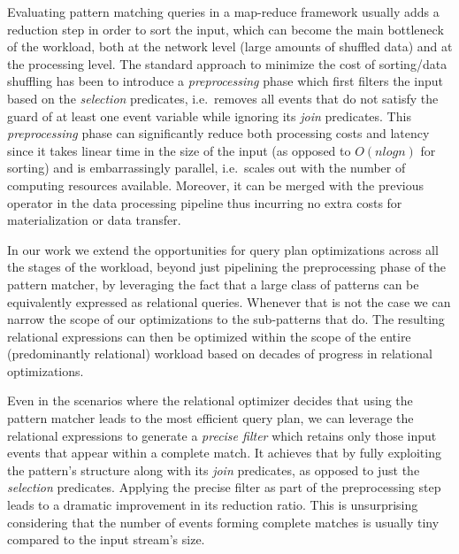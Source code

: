 Evaluating pattern matching queries in a map-reduce framework usually 
adds a reduction step in order to sort the input, which can become the main 
bottleneck of the workload, both at the network level (large amounts of 
shuffled data) and at the processing level.
The standard approach to minimize the cost of sorting/data shuffling has been 
to introduce a {\em preprocessing} phase which first filters the input based on 
the {\em selection} predicates, i.e.\ removes all events that do not satisfy 
the guard of at least one event variable while ignoring its {\em join} 
predicates.
This {\em preprocessing} phase can significantly reduce both processing costs 
and latency since it takes linear time in the size of the input (as opposed to 
$O(nlogn)$ for sorting) and is embarrassingly parallel, i.e.\ scales out with 
the number of computing resources available.
Moreover, it can be merged with the previous operator in the data processing 
pipeline thus incurring no extra costs for materialization or data transfer.    



In our work we extend the opportunities for query plan optimizations across all 
the stages of the workload, beyond just pipelining the preprocessing phase of 
the pattern matcher, by leveraging the fact that a large class of patterns can 
be equivalently expressed as relational queries.
Whenever that is not the case we can narrow the scope of our optimizations to 
the sub-patterns that do.
The resulting relational expressions can then be optimized within the scope of 
the entire (predominantly relational) workload based on decades of progress in 
relational optimizations.  


Even in the scenarios where the relational optimizer decides that using the 
pattern matcher leads to the most efficient query plan, we can leverage the 
relational expressions to generate a {\em precise filter} which retains only 
those input events that appear within a complete match. 
It achieves that by fully exploiting the pattern's structure along with its 
{\em join} predicates, as opposed to just the {\em selection} predicates.   
Applying the precise filter as part of the preprocessing step leads to a 
dramatic improvement in its reduction ratio. 
This is unsurprising considering that the number of events forming complete 
matches is usually tiny compared to the input stream's size.
 

